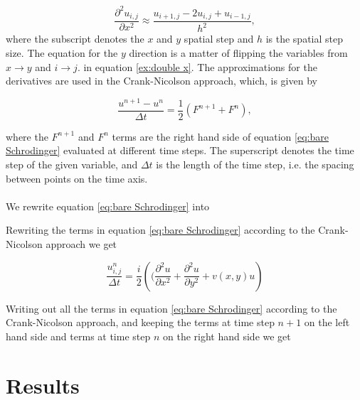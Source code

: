 \documentclass[english,notitlepage,reprint,nofootinbib]{revtex4-2}  %
\begin{document}
	\begin{equation}\label{ex:double x}
		\frac{\partial^2 u_{i,j}}{\partial x^2} \approx \frac{u_{i+1,j}-2u_{i,j}+u_{i-1,j}}{h^2},
	\end{equation}
	where the subscript denotes the $x$ and $y$ spatial step and $h$ is the spatial step size.
	The equation for the $y$ direction is a matter of flipping the variables from
	$x \rightarrow y$ and $i \rightarrow j$.
	in equation \ref{ex:double x}. The approximations for the derivatives are used in
	the Crank-Nicolson approach, which, is given by
	
	\begin{equation}
		\frac{u^{n+1}-u^{n}}{\Delta t} = \frac{1}{2}    \left(     F^{n+1} + F^n     \right),
	\end{equation}

	where the $F^{n+1}$ and $F^n$ terms are the right hand side of equation \ref{eq:bare Schrodinger}
	evaluated at different time steps. The superscript denotes the time step of the given variable, and $\Delta t$ is the length of the time step,
	i.e. the spacing between points on the time axis.\\ \\

	We rewrite equation \ref{eq:bare Schrodinger} into 

	Rewriting the terms in equation \ref{eq:bare Schrodinger}
	according to the Crank-Nicolson approach we get 

	\begin{equation}
	\frac{u^n_{i,j}}{\Delta t} = \frac{i}{2}\left(  (\frac{\partial^2 u}{\partial x^2} + \frac{\partial^2 u}{\partial y^2} + v(x,y) u        \right)
	\end{equation}
	

	
	
	
	Writing out all the terms in equation \ref{eq:bare Schrodinger}
	according to the Crank-Nicolson approach, and keeping the terms at time step $n+1$ on the left hand side and terms 
	at time step $n$ on the right hand side we get 


	

	


	
	
	\section{Results}\label{sec:results}
\end{document}
